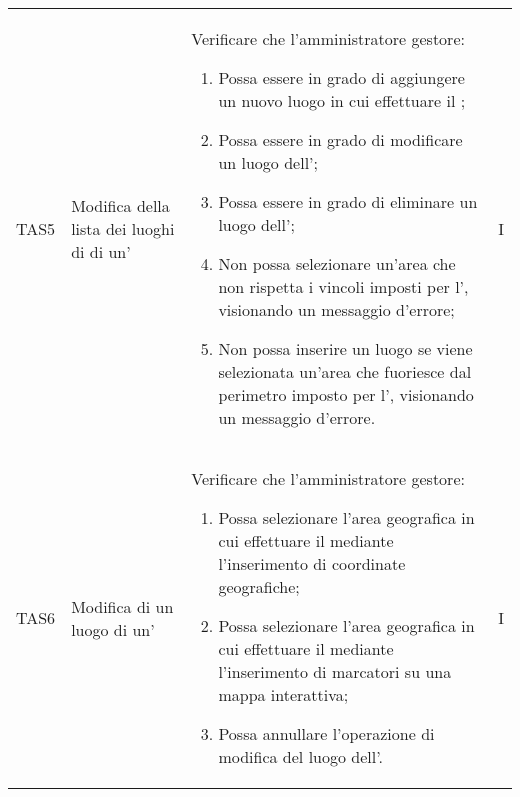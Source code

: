 {\begin{longtable}{ c  C{2.5cm}  C{10cm} C{1cm}}
TAS5 & Modifica della lista dei luoghi di  di un' & 
Verificare che l'amministratore gestore:
\begin{enumerate}
    \item Possa essere in grado di aggiungere un nuovo luogo in cui effettuare il ;
    \item Possa essere in grado di modificare un luogo dell';
    \item Possa essere in grado di eliminare un luogo dell';
    \item Non possa selezionare un'area che non rispetta i vincoli imposti per l', visionando un messaggio d'errore;
    \item Non possa inserire un luogo se viene selezionata un'area che fuoriesce dal perimetro imposto per l', visionando un messaggio d'errore.
\end{enumerate} & I \\

TAS6 & Modifica di un luogo di un' & 
Verificare che l'amministratore gestore:
\begin{enumerate}[resume]
    \item Possa selezionare l'area geografica in cui effettuare il  mediante l'inserimento di coordinate geografiche;
    \item Possa selezionare l'area geografica in cui effettuare il  mediante l'inserimento di marcatori su una mappa interattiva;
    \item Possa annullare l'operazione di modifica del luogo dell'.
\end{enumerate} & I \\


\end{longtable}}
